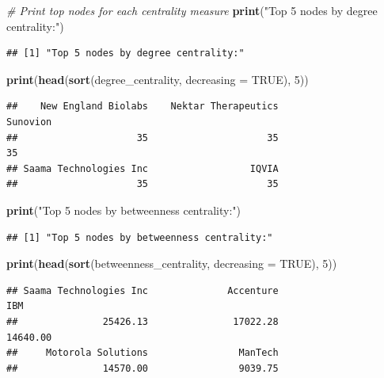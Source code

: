 \documentclass[
]{article}
\newenvironment{Shaded}{\begin{snugshade}}{\end{snugshade}}
\newcommand{\AttributeTok}[1]{\textcolor[rgb]{0.13,0.29,0.53}{#1}}
\newcommand{\CommentTok}[1]{\textcolor[rgb]{0.56,0.35,0.01}{\textit{#1}}}
\newcommand{\ConstantTok}[1]{\textcolor[rgb]{0.56,0.35,0.01}{#1}}
\newcommand{\DecValTok}[1]{\textcolor[rgb]{0.00,0.00,0.81}{#1}}
\newcommand{\FunctionTok}[1]{\textcolor[rgb]{0.13,0.29,0.53}{\textbf{#1}}}
\newcommand{\NormalTok}[1]{#1}
\newcommand{\StringTok}[1]{\textcolor[rgb]{0.31,0.60,0.02}{#1}}
\begin{document}
\begin{Shaded}
\begin{Highlighting}[]
\CommentTok{\# Print top nodes for each centrality measure}
\FunctionTok{print}\NormalTok{(}\StringTok{"Top 5 nodes by degree centrality:"}\NormalTok{)}
\end{Highlighting}
\end{Shaded}

\begin{verbatim}
## [1] "Top 5 nodes by degree centrality:"
\end{verbatim}

\begin{Shaded}
\begin{Highlighting}[]
\FunctionTok{print}\NormalTok{(}\FunctionTok{head}\NormalTok{(}\FunctionTok{sort}\NormalTok{(degree\_centrality, }\AttributeTok{decreasing =} \ConstantTok{TRUE}\NormalTok{), }\DecValTok{5}\NormalTok{))}
\end{Highlighting}
\end{Shaded}

\begin{verbatim}
##    New England Biolabs    Nektar Therapeutics               Sunovion 
##                     35                     35                     35 
## Saama Technologies Inc                  IQVIA 
##                     35                     35
\end{verbatim}

\begin{Shaded}
\begin{Highlighting}[]
\FunctionTok{print}\NormalTok{(}\StringTok{"Top 5 nodes by betweenness centrality:"}\NormalTok{)}
\end{Highlighting}
\end{Shaded}

\begin{verbatim}
## [1] "Top 5 nodes by betweenness centrality:"
\end{verbatim}

\begin{Shaded}
\begin{Highlighting}[]
\FunctionTok{print}\NormalTok{(}\FunctionTok{head}\NormalTok{(}\FunctionTok{sort}\NormalTok{(betweenness\_centrality, }\AttributeTok{decreasing =} \ConstantTok{TRUE}\NormalTok{), }\DecValTok{5}\NormalTok{))}
\end{Highlighting}
\end{Shaded}

\begin{verbatim}
## Saama Technologies Inc              Accenture                    IBM 
##               25426.13               17022.28               14640.00 
##     Motorola Solutions                ManTech 
##               14570.00                9039.75
\end{verbatim}
\end{document}

